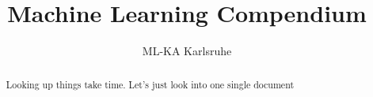 \documentclass[a4paper]{article}
\title{Machine Learning Compendium}
\author{ML-KA Karlsruhe}
\begin{document}
\maketitle
\begin{abstract}
	Looking up things take time. Let's just look into one single document
\end{abstract}





\end{document}
